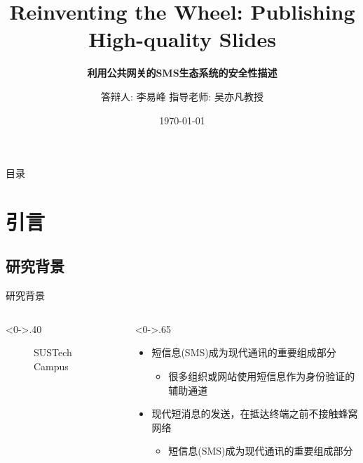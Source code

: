 \documentclass[10pt,aspectratio=43,mathserif,table]{beamer}
\title{Reinventing the Wheel: Publishing High-quality Slides}
\subtitle{\fontsize{9pt}{14pt}\textbf{利用公共网关的SMS生态系统的安全性描述}}
\author{答辩人: 李易峰 \newline \newline 指导老师: 吴亦凡教授}
\institute{\fontsize{8pt}{14pt}中北大学英雄与联盟工程学院}
\date{\today}
\begin{document}

\frame{\titlepage}

\section[目录]{}   %
\begin{frame}{目录}
\tableofcontents
\end{frame}

\section{引言}  %
\subsection{研究背景}
\begin{frame}{研究背景}
\begin{columns}[T] %
\begin{column}<0->{.40\textwidth}
	\begin{figure}[thpb]
		\centering
		\caption{SUSTech Campus}
		\label{fig:campus}
	\end{figure}
\end{column}%
\hfill%
\begin{column}<0->{.65\textwidth}
	\begin{itemize}
		\item<1-> 短信息(SMS)成为现代通讯的重要组成部分
		\begin{itemize}
			\item<1-> 很多组织或网站使用短信息作为身份验证的辅助通道
		\end{itemize}
		\item<2-> 现代短消息的发送，在抵达终端之前不接触蜂窝网络
		\begin{itemize}
			\item<2-> 短信息(SMS)成为现代通讯的重要组成部分
		\end{itemize}
	\end{itemize}
\end{column}%
\end{columns}
\end{frame}
\end{document}
